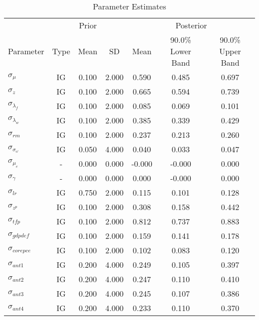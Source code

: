 \documentclass[12pt]{article}
\begin{document}
\pagestyle{empty}
\begin{table}[h]
\centering
\caption{Parameter Estimates}
\vspace*{.2cm}
{\small 
\begin{tabular}{lcccccc}
\hline
\multicolumn{1}{c}{} & \multicolumn{3}{c}{Prior} & \multicolumn{3}{c}{Posterior}\\ 
Parameter & Type & Mean & SD & Mean & 90.0\% {\tiny Lower Band} & 90.0\% {\tiny Upper Band}\\ 
\cmidrule(lr){1-1}\cmidrule(lr){2-4}\cmidrule(lr){5-7}
$\sigma_{\mu}$ & IG &    0.100 &    2.000 &    0.590 &    0.485 &    0.697 \\
$\sigma_{z}$ & IG &    0.100 &    2.000 &    0.665 &    0.594 &    0.739 \\
$\sigma_{\lambda_f}$ & IG &    0.100 &    2.000 &    0.085 &    0.069 &    0.101 \\
$\sigma_{\lambda_w}$ & IG &    0.100 &    2.000 &    0.385 &    0.339 &    0.429 \\
$\sigma_{rm}$ & IG &    0.100 &    2.000 &    0.237 &    0.213 &    0.260 \\
$\sigma_{\sigma_\omega}$ & IG &    0.050 &    4.000 &    0.040 &    0.033 &    0.047 \\
$\sigma_{\mu_e}$ & - &    0.000 &    0.000 &   -0.000 &   -0.000 &    0.000 \\
$\sigma_{\gamma}$ & - &    0.000 &    0.000 &    0.000 &   -0.000 &    0.000 \\
$\sigma_{lr}$ & IG &    0.750 &    2.000 &    0.115 &    0.101 &    0.128 \\
$\sigma_{z^p}$ & IG &    0.100 &    2.000 &    0.308 &    0.158 &    0.442 \\
$\sigma_{tfp}$ & IG &    0.100 &    2.000 &    0.812 &    0.737 &    0.883 \\
$\sigma_{gdpdef}$ & IG &    0.100 &    2.000 &    0.159 &    0.141 &    0.178 \\
$\sigma_{corepce}$ & IG &    0.100 &    2.000 &    0.102 &    0.083 &    0.120 \\
$\sigma_{ant1}$ & IG &    0.200 &    4.000 &    0.249 &    0.105 &    0.397 \\
$\sigma_{ant2}$ & IG &    0.200 &    4.000 &    0.247 &    0.110 &    0.410 \\
$\sigma_{ant3}$ & IG &    0.200 &    4.000 &    0.245 &    0.107 &    0.386 \\
$\sigma_{ant4}$ & IG &    0.200 &    4.000 &    0.233 &    0.110 &    0.370 \\

\end{tabular}}
\end{table}
\end{document}
